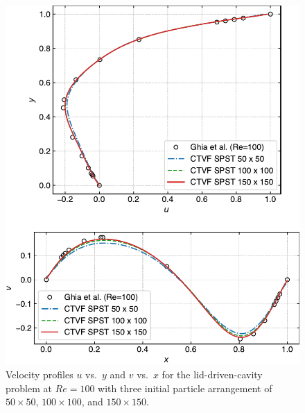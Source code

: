 \documentclass[preprint,12pt]{elsarticle}
\begin{document}
%
\begin{figure}[!htpb]
  \centering
  \includegraphics[width=1\linewidth]{fig_14}
  \caption{Velocity profiles $u$ vs.\ $y$ and $v$ vs.\ $x$ for the
    lid-driven-cavity problem at $Re=100$ with three initial particle
    arrangement of $50 \times 50$, $100 \times 100$, and $150 \times
    150$.}%
  \label{fig:ldc:uv_re100}
\end{figure}
%
\end{document}
